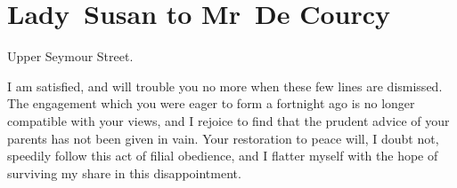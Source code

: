 \chapter{Lady~Susan to Mr~De Courcy}
  
  \vfill
  \begin{mail}{Upper Seymour Street.}{}

I am satisfied, and will trouble you no more when these few lines are dismissed. The engagement which you were eager to form a fortnight ago is no longer compatible with your views, and I rejoice to find that the prudent advice of your parents has not been given in vain. Your restoration to peace will, I doubt not, speedily follow this act of filial obedience, and I flatter myself with the hope of surviving my share in this disappointment. 
\end{mail}
\vfill
